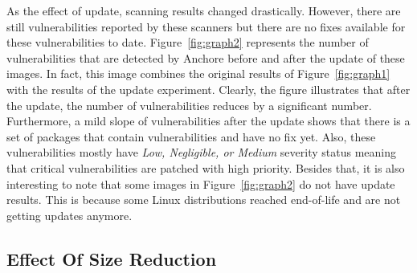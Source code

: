 \documentclass[a4paper,num-refs]{oup-contemporary}
\begin{document}
As the effect of update,
scanning results changed drastically. However, there are still
vulnerabilities reported by these scanners but there are no fixes available for these vulnerabilities
to date.
Figure~\ref{fig:graph2} represents the number of vulnerabilities that are detected by Anchore before and after 
the update of these images. 
In fact, this image combines the original results of Figure~\ref{fig:graph1} with the results of the update
experiment.
Clearly, the figure illustrates that after the update, the number of vulnerabilities reduces by a
significant number. Furthermore, a mild slope of vulnerabilities after the update shows that
there is a set of packages that contain vulnerabilities and have no fix yet. Also, these
vulnerabilities mostly have \textit{Low, Negligible, or Medium} severity status meaning that
critical vulnerabilities are patched with high priority.
Besides that, it is also interesting to note that some images in Figure~\ref{fig:graph2}
do not have update results. This is because some Linux distributions reached end-of-life and
are not getting updates anymore.



\subsection{Effect Of Size Reduction}
\end{document}
